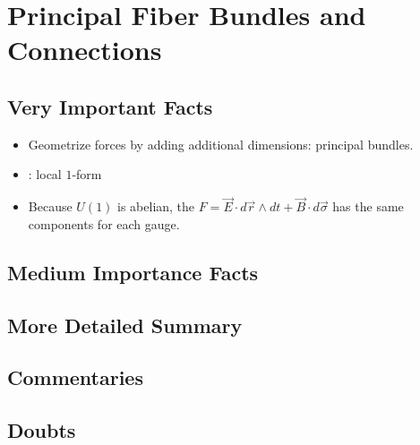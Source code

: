 \documentclass[12pt]{report}
\begin{document}
\chapter{Principal Fiber Bundles and Connections}

\section{Very Important Facts}

\begin{itemize}
    \item Geometrize forces by adding additional dimensions: principal bundles.
    
    \item {}: local $1$-form
    
    \item Because $U(1)$ is abelian, the  $F = \vec E \cdot d\vec r \wedge dt + \vec B \cdot d\vec \sigma$ has the same components for each gauge.
\end{itemize}
\section{Medium Importance Facts}

\section{More Detailed Summary}

\section{Commentaries}

\section{Doubts}
\end{document}
